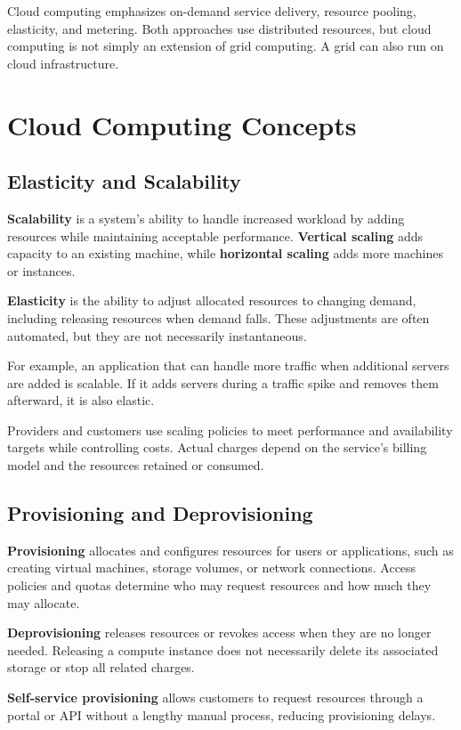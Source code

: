 Cloud computing emphasizes on-demand service delivery, resource pooling, elasticity, and metering. Both approaches use distributed resources, but cloud computing is not simply an extension of grid computing. A grid can also run on cloud infrastructure.

\section{Cloud Computing Concepts}

\subsection{Elasticity and Scalability}
\textbf{Scalability} is a system's ability to handle increased workload by adding resources while maintaining acceptable performance. \textbf{Vertical scaling} adds capacity to an existing machine, while \textbf{horizontal scaling} adds more machines or instances.

\textbf{Elasticity} is the ability to adjust allocated resources to changing demand, including releasing resources when demand falls. These adjustments are often automated, but they are not necessarily instantaneous.

For example, an application that can handle more traffic when additional servers are added is scalable. If it adds servers during a traffic spike and removes them afterward, it is also elastic.

Providers and customers use scaling policies to meet performance and availability targets while controlling costs. Actual charges depend on the service's billing model and the resources retained or consumed.

\subsection{Provisioning and Deprovisioning}
\textbf{Provisioning} allocates and configures resources for users or applications, such as creating virtual machines, storage volumes, or network connections. Access policies and quotas determine who may request resources and how much they may allocate.

\textbf{Deprovisioning} releases resources or revokes access when they are no longer needed. Releasing a compute instance does not necessarily delete its associated storage or stop all related charges.

\textbf{Self-service provisioning} allows customers to request resources through a portal or API without a lengthy manual process, reducing provisioning delays.


